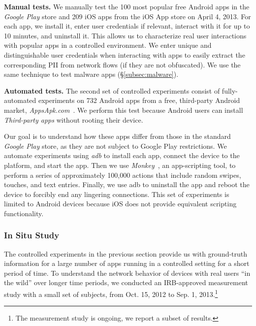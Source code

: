\noindent\textbf{Manual tests.} We manually test the
100 most popular free Android apps in the \emph{Google Play} store and 209
iOS apps from the iOS App store on April 4, 2013. For each
app, we install it, enter user credentials %
if relevant, interact with it for up to 10 minutes, and uninstall
it. This allows us to characterize real user interactions with popular apps
in a controlled environment.  
We enter unique and distinguishable user credentials when 
interacting with apps to easily extract the corresponding PII from 
network flows (if they are not obfuscated). We use the same technique 
to test malware apps (\S\ref{subsec:malware}).

\noindent\textbf{Automated tests.} The second set of controlled experiments consist of fully-automated
experiments on 732 Android apps from a free,
third-party Android market, \emph{AppsApk.com}~\cite{appsapk}.
We perform this test because Android users can install
\emph{Third-party apps} without rooting their device. 

Our goal is to understand how these apps differ from those in the standard \emph{Google Play} 
store, as they are not subject to Google Play restrictions.
We automate experiments using \emph{adb} to
install each app, connect the device to the \meddle platform, and
start the app. Then we use \emph{Monkey}~\cite{adbmonkey}, an app-scripting 
tool, to perform a series of  approximately 100,000 actions that include
random swipes, touches, and text entries.  Finally, we use adb to
uninstall the app and reboot the device to forcibly end any
lingering connections. This set of experiments is limited to
Android devices because iOS does not provide equivalent 
scripting functionality. 

\subsubsection{In Situ Study}
\label{sec:dataset-wild-measurements}

The controlled experiments in the previous section provide us with 
ground-truth information for a large number of apps running in a controlled 
setting for a short period of time. To understand the network behavior of 
devices with real users ``in the wild'' over longer time periods, we conducted 
an IRB-approved measurement study with a small set of subjects, from 
Oct. 15, 2012 to Sep. 1, 2013.\footnote{The measurement study is ongoing, we report a subset of results.}

